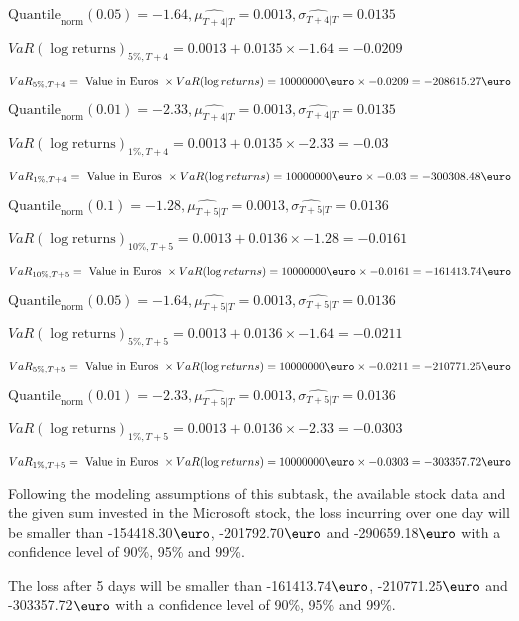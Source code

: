 $\text{Quantile}_\text{norm}(0.05) = -1.64,\hat{\mu_{T+4|T}} = 0.0013, \hat{\sigma_{T+4|T}} = 0.0135$

$VaR(\log \text{returns})_{5\%, T + 4} = 0.0013 + 0.0135\times-1.64 = -0.0209$

$VaR_{5\%, T + 4} = \text{ Value in Euros } \times VaR(\log returns) = 10 000 000 \text{\euro} \times-0.0209 = -208615.27 \text{\euro}$


$\text{Quantile}_\text{norm}(0.01) = -2.33,\hat{\mu_{T+4|T}} = 0.0013, \hat{\sigma_{T+4|T}} = 0.0135$

$VaR(\log \text{returns})_{1\%, T + 4} = 0.0013 + 0.0135\times-2.33 = -0.03$

$VaR_{1\%, T + 4} = \text{ Value in Euros } \times VaR(\log returns) = 10 000 000 \text{\euro} \times-0.03 = -300308.48 \text{\euro}$


$\text{Quantile}_\text{norm}(0.1) = -1.28,\hat{\mu_{T+5|T}} = 0.0013, \hat{\sigma_{T+5|T}} = 0.0136$

$VaR(\log \text{returns})_{10\%, T + 5} = 0.0013 + 0.0136\times-1.28 = -0.0161$

$VaR_{10\%, T + 5} = \text{ Value in Euros } \times VaR(\log returns) = 10 000 000 \text{\euro} \times-0.0161 = -161413.74 \text{\euro}$


$\text{Quantile}_\text{norm}(0.05) = -1.64,\hat{\mu_{T+5|T}} = 0.0013, \hat{\sigma_{T+5|T}} = 0.0136$

$VaR(\log \text{returns})_{5\%, T + 5} = 0.0013 + 0.0136\times-1.64 = -0.0211$

$VaR_{5\%, T + 5} = \text{ Value in Euros } \times VaR(\log returns) = 10 000 000 \text{\euro} \times-0.0211 = -210771.25 \text{\euro}$


$\text{Quantile}_\text{norm}(0.01) = -2.33,\hat{\mu_{T+5|T}} = 0.0013, \hat{\sigma_{T+5|T}} = 0.0136$

$VaR(\log \text{returns})_{1\%, T + 5} = 0.0013 + 0.0136\times-2.33 = -0.0303$

$VaR_{1\%, T + 5} = \text{ Value in Euros } \times VaR(\log returns) = 10 000 000 \text{\euro} \times-0.0303 = -303357.72 \text{\euro}$


Following the modeling assumptions of this subtask, the available stock data and the given sum invested in the Microsoft stock, the loss incurring over one day will be smaller than -154418.30$\text{\euro}$, -201792.70$\text{\euro}$  and -290659.18$\text{\euro}$  with a confidence level of 90\%, 95\%  and 99\%.

The loss after 5 days will be smaller than -161413.74$\text{\euro}$, -210771.25$\text{\euro}$  and -303357.72$\text{\euro}$  with a confidence level of 90\%, 95\%  and 99\%.

